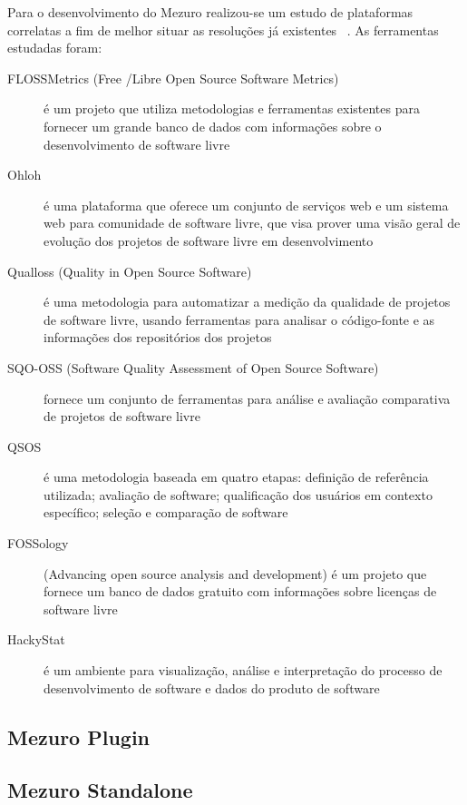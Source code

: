 Para o desenvolvimento do Mezuro realizou-se um estudo de plataformas correlatas a fim de melhor situar as resoluções já existentes~\cite{meirelles2013}%
. As ferramentas estudadas foram:

\begin{description}
\item[FLOSSMetrics (Free /Libre Open Source Software Metrics)]
é um projeto que utiliza metodologias e ferramentas existentes para fornecer um grande banco de dados com informações sobre o desenvolvimento de software livre
\item[Ohloh]
é uma plataforma que oferece um conjunto de serviços web e um sistema web para comunidade de software livre, que visa prover uma visão geral de evolução dos projetos de software livre em desenvolvimento
\item[Qualloss (Quality in Open Source Software)]
é uma metodologia para automatizar a medição da qualidade de projetos de software livre, usando ferramentas para analisar o código-fonte e as informações dos repositórios dos projetos
\item[SQO-OSS (Software Quality Assessment of Open Source Software)]
fornece um conjunto de ferramentas para análise e avaliação comparativa de projetos de software livre
\item[QSOS]
é uma metodologia baseada em quatro etapas: definição de referência utilizada; avaliação de software; qualificação dos usuários em contexto específico; seleção e comparação de software
\item[FOSSology]
(Advancing open source analysis and development) é um projeto que fornece um banco de dados gratuito com informações sobre licenças de software livre
\item[HackyStat]
é um ambiente para visualização, análise e interpretação do processo de desenvolvimento de software e dados do produto de software
\end{description}

\subsection{Mezuro Plugin}
\label{mezuro-plugin}

\subsection{Mezuro Standalone}
\label{mezuro-standalone}

